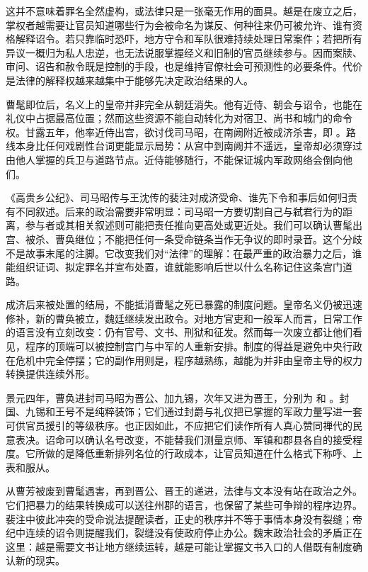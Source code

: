 这并不意味着罪名全然虚构，或法律只是一张毫无作用的面具。越是在废立之后，掌权者越需要让官员知道哪些行为会被命名为谋反、何种往来仍可被允许、谁有资格解释诏令。若只靠临时恐吓，地方守令和军队很难持续处理日常案件；若把所有异议一概归为私人忠逆，也无法说服掌握经义和旧制的官员继续参与。因而案牍、审问、诏告和赦令既是控制的手段，也是维持官僚社会可预测性的必要条件。代价是法律的解释权越来越集中于能够先决定政治结果的人。

曹髦即位后，名义上的皇帝并非完全从朝廷消失。他有近侍、朝会与诏令，也能在礼仪中占据最高位置；然而这些资源不能自动转化为对宿卫、尚书和城门的命令权。甘露五年，他率近侍出宫，欲讨伐司马昭，在南阙附近被成济杀害，即
。路线本身比任何戏剧性台词更能显示局势：从宫中到南阙并不遥远，皇帝却必须穿过由他人掌握的兵卫与道路节点。近侍能够随行，不能保证城内军政网络会倒向他们。

《高贵乡公纪》、司马昭传与王沈传的裴注对成济受命、谁先下令和事后如何归责有不同叙述。后来的政治需要非常明显：司马昭一方要切割自己与弑君行为的距离，参与者或其相关叙述则可能把责任推向更高处或更近处。我们可以确认曹髦出宫、被杀、曹奂继位；不能把任何一条受命链条当作无争议的即时录音。这个分歧不是故事末尾的注脚。它改变我们对“法律”的理解：在最严重的政治暴力之后，谁能组织证词、拟定罪名并宣布处置，谁就能影响后世以什么名称记住这条宫门道路。

成济后来被处置的结局，不能抵消曹髦之死已暴露的制度问题。皇帝名义仍被迅速修补，新的曹奂被立，魏廷继续发出政令。对地方官吏和一般军人而言，日常工作的语言没有立刻改变：仍有官号、文书、刑狱和征发。然而每一次废立都让他们看见，程序的顶端可以被控制宫门与中军的人重新安排。制度的得益是避免中央行政在危机中完全停摆；它的副作用则是，程序越熟练，越能为并非由皇帝主导的权力转换提供连续外形。

景元四年，曹奂进封司马昭为晋公、加九锡，次年又进为晋王，分别为
和
。封国、九锡和王号不是纯粹装饰；它们通过封爵与礼仪把已掌握的军政力量写进一套可供官员援引的等级秩序。也正因如此，不应把它们读作所有人真心赞同禅代的民意表决。诏命可以确认名号改变，不能替我们测量京师、军镇和郡县各自的接受程度。它所做的是降低重新排列名位的行政成本，让官员知道在什么格式下称呼、上表和服从。

从曹芳被废到曹髦遇害，再到晋公、晋王的递进，法律与文本没有站在政治之外。它们把暴力的结果转换成可以送往州郡的语言，也保留了某些可争辩的程序边界。裴注中彼此冲突的受命说法提醒读者，正史的秩序并不等于事情本身没有裂缝；帝纪中连续的诏令则提醒我们，裂缝没有使政府停止办公。魏末政治社会的矛盾正在这里：越是需要文书让地方继续运转，越是可能让掌握文书入口的人借既有制度确认新的现实。

